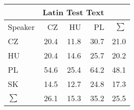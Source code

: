 \begin{tabular}{l|rrr|r}
\hline
 & \multicolumn{3}{c}{Latin Test Text} & \\
\hline
 Speaker   &   CZ &   HU &   PL &   $\sum$ \\
\hline
 CZ        & 20.4 & 11.8 & 30.7 &     21.0 \\
 HU        & 20.4 & 14.6 & 25.7 &     20.2 \\
 PL        & 54.6 & 25.4 & 64.2 &     48.1 \\
 SK        & 14.5 & 12.7 & 24.8 &     17.3 \\
\hline
 $\sum$   & 26.1 & 15.3 & 35.2 &     25.5 \\
\hline
\end{tabular}